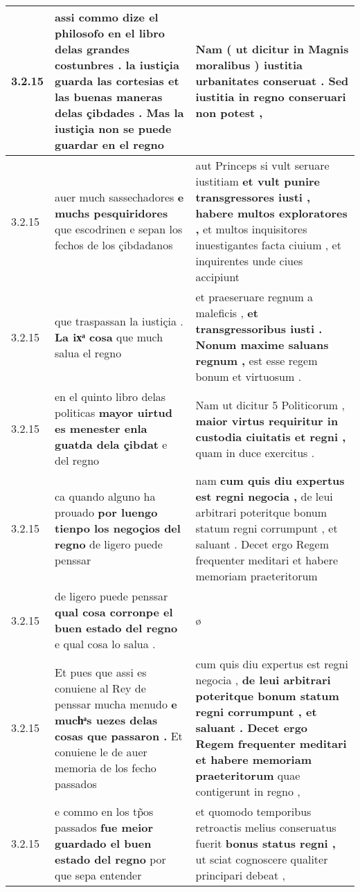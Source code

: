 \begin{tabular}{|p{1cm}|p{6.5cm}|p{6.5cm}|}
3.2.15 & assi commo dize el philosofo en el libro delas grandes costunbres . \textbf{ la iustiçia guarda las cortesias et las buenas maneras delas çibdades . } Mas la iustiçia non se puede guardar en el regno & Nam ( ut dicitur in Magnis moralibus ) \textbf{ iustitia urbanitates conseruat . } Sed iustitia in regno conseruari non potest , \\\hline
3.2.15 & auer much sassechadores \textbf{ e muchs pesquiridores } que escodrinen e sepan los fechos de los çibdadanos & aut Princeps si vult seruare iustitiam \textbf{ et vult punire transgressores iusti , habere multos exploratores , } et multos inquisitores inuestigantes facta ciuium , et inquirentes unde ciues accipiunt \\\hline
3.2.15 & que traspassan la iustiçia . \textbf{ La ixͣ cosa } que much salua el regno & et praeseruare regnum a maleficis , \textbf{ et transgressoribus iusti . Nonum maxime saluans regnum , } est esse regem bonum et virtuosum . \\\hline
3.2.15 & en el quinto libro delas politicas \textbf{ mayor uirtud es menester enla guatda dela çibdat } e del regno & Nam ut dicitur 5 Politicorum , \textbf{ maior virtus requiritur in custodia ciuitatis et regni , } quam in duce exercitus . \\\hline
3.2.15 & ca quando alguno ha prouado \textbf{ por luengo tienpo los negoçios del regno } de ligero puede penssar & nam \textbf{ cum quis diu expertus est regni negocia , } de leui arbitrari poteritque bonum statum regni corrumpunt , et saluant . Decet ergo Regem frequenter meditari et habere memoriam praeteritorum \\\hline
3.2.15 & de ligero puede penssar \textbf{ qual cosa corronpe el buen estado del regno } e qual cosa lo salua . & ø \\\hline
3.2.15 & Et pues que assi es conuiene al Rey de penssar mucha menudo \textbf{ e muchͣs uezes delas cosas que passaron . } Et conuiene le de auer memoria de los fecho passados & cum quis diu expertus est regni negocia , \textbf{ de leui arbitrari poteritque bonum statum regni corrumpunt , et saluant . Decet ergo Regem frequenter meditari et habere memoriam praeteritorum } quae contigerunt in regno , \\\hline
3.2.15 & e commo en los tp̃os passados \textbf{ fue meior guardado el buen estado del regno } por que sepa entender & et quomodo temporibus retroactis melius conseruatus fuerit \textbf{ bonus status regni , } ut sciat cognoscere qualiter principari debeat , \\\hline

\end{tabular}
